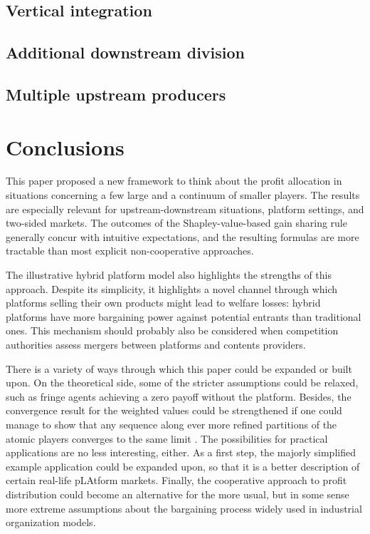 \documentclass[a4paper]{article}
\begin{document}
\subsection{Vertical integration}


\subsection{Additional downstream division}


\subsection{Multiple upstream producers}



\section{Conclusions}

This paper proposed a new framework to think about the profit allocation in situations concerning a few large and a continuum of smaller players.
The results are especially relevant for upstream-downstream situations, platform settings, and two-sided markets.
The outcomes of the Shapley-value-based gain sharing rule generally concur with intuitive expectations, and the resulting formulas are more tractable than most explicit non-cooperative approaches.

The illustrative hybrid platform model also highlights the strengths of this approach.
Despite its simplicity, it highlights a novel channel through which platforms selling their own products might lead to welfare losses: hybrid platforms have more bargaining power against potential entrants than traditional ones.
This mechanism should probably also be considered when competition authorities assess mergers between platforms and contents providers.

There is a variety of ways through which this paper could be expanded or built upon.
On the theoretical side, some of the stricter assumptions could be relaxed, such as fringe agents achieving a zero payoff without the platform.
Besides, the convergence result for the weighted values could be strengthened if one could manage to show that any sequence along ever more refined partitions of the atomic players converges to the same limit \parencite[à la][]{fogelman1980asymptotic}.
The possibilities for practical applications are no less interesting, either.
As a first step, the majorly simplified example application could be expanded upon, so that it is a better description of certain real-life pLAtform markets.
Finally, the cooperative approach to profit distribution could become an alternative for the more usual, but in some sense more extreme assumptions about the bargaining process widely used in industrial organization models.
\end{document}
